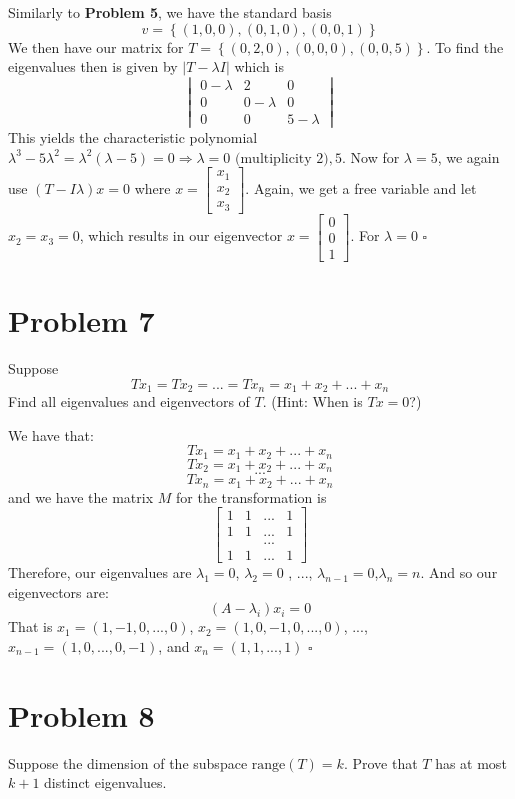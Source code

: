 \documentclass[12pt]{article}
\newcommand{\set}[1]{\left\{ #1\right\}}
\newenvironment{proof}{\noindent{\bf Proof.}}{\hfill $\square$\medskip}
\begin{document}
\begin{proof}
Similarly to \textbf{Problem 5}, we have the standard basis $$v=\set{(1,0,0),(0,1,0),(0,0,1)}$$
We then have our matrix for $T=\set{(0,2,0), (0,0,0), (0,0,5)}$. To find the eigenvalues then is given by $|T-\lambda I|$ which is
$$
\begin{vmatrix}
0-\lambda&2&0\\
0&0-\lambda&0\\
0&0&5-\lambda
\end{vmatrix}
$$
This yields the characteristic polynomial $\lambda^{3}-5\lambda^{2}=\lambda^{2}(\lambda-5)=0\Rightarrow\lambda =0\text{ (multiplicity 2)}, 5$. Now for $\lambda=5$, we again use $(T-I\lambda)x=0$ where $x=\begin{bmatrix}x_{1}\\x_{2}\\x_{3}\end{bmatrix}$. Again, we get a free variable and let $x_{2}=x_{3}=0$, which results in our eigenvector $x=\begin{bmatrix}0\\0\\1\end{bmatrix}$. For $\lambda=0$
\end{proof}


\section{Problem 7}
Suppose
$$Tx_{1}=Tx_{2}=...=Tx_{n}=x_{1}+x_{2}+...+x_{n}$$
Find all eigenvalues and eigenvectors of $T$. (Hint: When is $Tx=0$?)

\begin{proof}
We have that:
$$Tx_{1}=x_{1}+x_{2}+...+x_{n}$$
$$Tx_{2}=x_{1}+x_{2}+...+x_{n}$$
$$...$$
$$Tx_{n}=x_{1}+x_{2}+...+x_{n}$$
and we have the matrix $M$ for the transformation is
$$\begin{bmatrix}
1&1&...&1\\
1&1&...&1\\
&&...\\
1&1&...&1
\end{bmatrix}$$
Therefore, our eigenvalues are $\lambda_{1}=0$, $\lambda_{2}=0$ , ..., $\lambda_{n-1}=0$,$\lambda_{n}=n$. And so our eigenvectors are:
$$(A-\lambda_{i})x_{i}=0$$
That is $x_{1}=(1,-1,0,...,0)$, $x_{2}=(1,0,-1,0,...,0)$, ..., $x_{n-1}=(1,0,...,0,-1)$, and $x_{n}=(1,1,...,1)$
\end{proof}


\section{Problem 8}
Suppose the dimension of the subspace $\text{range}(T)=k$. Prove that $T$ has at most $k+1$ distinct eigenvalues.
\end{document}
